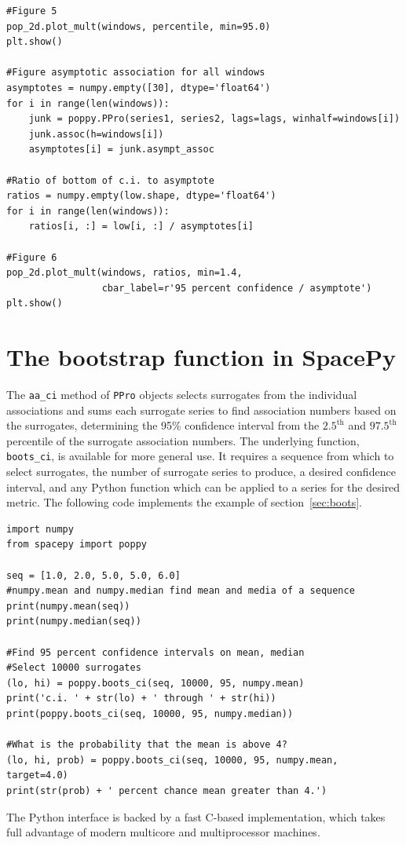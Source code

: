 \documentclass[letterpaper,11pt]{article}
\begin{document}
\begin{lstlisting}
#Figure 5
pop_2d.plot_mult(windows, percentile, min=95.0)
plt.show()

#Figure asymptotic association for all windows
asymptotes = numpy.empty([30], dtype='float64')
for i in range(len(windows)):
    junk = poppy.PPro(series1, series2, lags=lags, winhalf=windows[i])
    junk.assoc(h=windows[i])
    asymptotes[i] = junk.asympt_assoc

#Ratio of bottom of c.i. to asymptote
ratios = numpy.empty(low.shape, dtype='float64')
for i in range(len(windows)):
    ratios[i, :] = low[i, :] / asymptotes[i]

#Figure 6
pop_2d.plot_mult(windows, ratios, min=1.4,
                 cbar_label=r'95 percent confidence / asymptote')
plt.show()
\end{lstlisting}

\section{The bootstrap function in SpacePy}
\label{sec:boots_ci}
The \texttt{aa\_ci} method of \texttt{PPro} objects selects surrogates
from the individual associations and sums each surrogate series to
find association numbers based on the surrogates, determining the 95\%
confidence interval from the $\mathrm{2.5^{th}}$ and
$\mathrm{97.5^{th}}$ percentile of the surrogate association
numbers. The underlying function, \texttt{boots\_ci}, is available for
more general use. It requires a sequence from which to select
surrogates, the number of surrogate series to produce, a desired
confidence interval, and any Python function which can be applied to a
series for the desired metric. The following code implements the
example of section~\ref{sec:boots}.
\begin{lstlisting}
import numpy
from spacepy import poppy

seq = [1.0, 2.0, 5.0, 5.0, 6.0]
#numpy.mean and numpy.median find mean and media of a sequence
print(numpy.mean(seq))
print(numpy.median(seq))

#Find 95 percent confidence intervals on mean, median
#Select 10000 surrogates
(lo, hi) = poppy.boots_ci(seq, 10000, 95, numpy.mean)
print('c.i. ' + str(lo) + ' through ' + str(hi))
print(poppy.boots_ci(seq, 10000, 95, numpy.median))

#What is the probability that the mean is above 4?
(lo, hi, prob) = poppy.boots_ci(seq, 10000, 95, numpy.mean, target=4.0)
print(str(prob) + ' percent chance mean greater than 4.')
\end{lstlisting}
The Python interface is backed by a fast C-based implementation, which
takes full advantage of modern multicore and multiprocessor machines.



\end{document}
